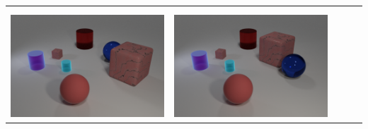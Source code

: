 \begin{table}
\begin{tabular}{@{}ccccc@{}}
\begin{minipage}{.2\textwidth}
    \end{minipage}
\\ \\
    \begin{minipage}{.2\textwidth}
      \includegraphics[width=\linewidth]{figures/clevr_datasets/CLEVRA_examples/train3.png}
    \end{minipage}
    &
    \begin{minipage}{.2\textwidth}
      \includegraphics[width=\linewidth]{figures/clevr_datasets/CLEVRA_examples/train_relation3.png}
    \end{minipage}
    &&
    \begin{minipage}{.2\textwidth}

\end{minipage}
\end{tabular}
\end{table}
